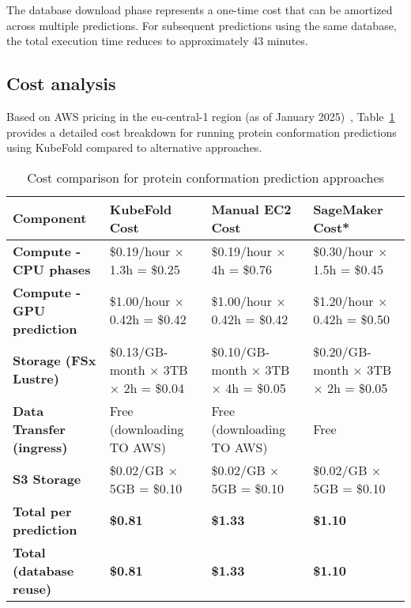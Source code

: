 The database download phase represents a one-time cost that can be amortized across multiple predictions. For subsequent predictions using the same database, the total execution time reduces to approximately 43 minutes.

\subsection{Cost analysis}

Based on AWS pricing in the eu-central-1 region (as of January 2025)~\cite{aws-ec2-pricing,aws-fsx-pricing}, Table~\ref{tab:cost_analysis} provides a detailed cost breakdown for running protein conformation predictions using KubeFold compared to alternative approaches.

\begin{table}[H]
    \centering
    \small
    \begin{tabularx}{\textwidth}{|X|X|X|X|}
        \hline
        \textbf{Component} & \textbf{KubeFold Cost} & \textbf{Manual EC2 Cost} & \textbf{SageMaker Cost*} \\
        \hline
        \textbf{Compute - CPU phases} & \$0.19/hour × 1.3h = \$0.25 & \$0.19/hour × 4h = \$0.76 & \$0.30/hour × 1.5h = \$0.45 \\
        \hline
        \textbf{Compute - GPU prediction} & \$1.00/hour × 0.42h = \$0.42 & \$1.00/hour × 0.42h = \$0.42 & \$1.20/hour × 0.42h = \$0.50 \\
        \hline
        \textbf{Storage (FSx Lustre)} & \$0.13/GB-month × 3TB × 2h = \$0.04 & \$0.10/GB-month × 3TB × 4h = \$0.05 & \$0.20/GB-month × 3TB × 2h = \$0.05 \\
        \hline
        \textbf{Data Transfer (ingress)} & Free (downloading TO AWS) & Free (downloading TO AWS) & Free \\
        \hline
        \textbf{S3 Storage} & \$0.02/GB × 5GB = \$0.10 & \$0.02/GB × 5GB = \$0.10 & \$0.02/GB × 5GB = \$0.10 \\
        \hline
        \textbf{Total per prediction} & \textbf{\$0.81} & \textbf{\$1.33} & \textbf{\$1.10} \\
        \hline
        \textbf{Total (database reuse)} & \textbf{\$0.81} & \textbf{\$1.33} & \textbf{\$1.10} \\
        \hline
    \end{tabularx}
    \caption{Cost comparison for protein conformation prediction approaches}
    \label{tab:cost_analysis}
\end{table}

